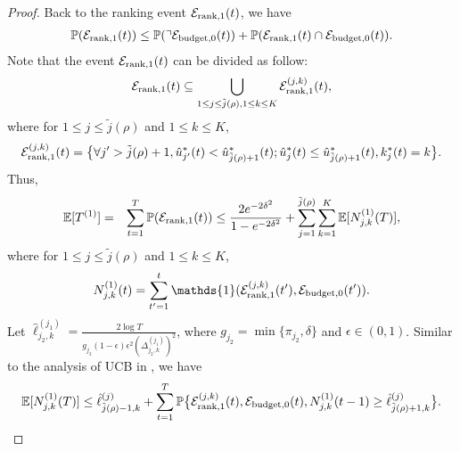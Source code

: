 \begin{proof}
Back to the ranking event $\mathcal{E}_{{\rm rank}, 1}(t)$, we have
\begin{eqnarray}
\mathbb{P}(\mathcal{E}_{{\rm rank}, 1}(t))
\leq  \mathbb{P}(\urcorner\mathcal{E}_{\rm budget, 0}(t))
+\mathbb{P}(\mathcal{E}_{{\rm rank}, 1}(t)\cap \mathcal{E}_{\rm budget, 0}(t)). \nonumber
\end{eqnarray}
Note that the event $\mathcal{E}_{{\rm rank}, 1}(t)$ can be divided as follow:
\begin{eqnarray}
\mathcal{E}_{{\rm rank}, 1}(t) \subseteq  \bigcup_{1\leq j \leq \tilde{j}(\rho), 1\leq k\leq K} \mathcal{E}^{(j,k)}_{{\rm rank}, 1}(t), \nonumber
\end{eqnarray}
where for $1 \leq j \leq \tilde{j}(\rho)$ and $1 \leq k \leq K$,
\begin{eqnarray}
 \mathcal{E}^{(j,k)}_{{\rm rank}, 1}(t) = \big\{\forall j' > \tilde{j}(\rho) +1,\hat{u}^*_{j'}(t) < \hat{u}^*_{\tilde{j}(\rho) +1}(t);
\hat{u}^*_{j}(t) \leq \hat{u}^*_{\tilde{j}(\rho)+1}(t), k_j^*(t) = k\big\}.\nonumber
\end{eqnarray}
Thus,
\begin{eqnarray}\label{eq:error1_partition}
\mathbb{E}[T^{(1)}] &=& \sum_{t = 1}^T \mathbb{P}(\mathcal{E}_{{\rm rank}, 1}(t))\leq \frac{2e^{-2\delta^2}}{1 - e^{-2\delta^2}} + \sum_{j = 1}^{\tilde{j}(\rho)} \sum_{k= 1}^K\mathbb{E}[N^{(1)}_{j,k}(T)],\nonumber\\
\end{eqnarray}
where for $1 \leq j\leq \tilde{j}(\rho)$ and $1 \leq k \leq K$,
\begin{eqnarray}
N^{(1)}_{j,k}(t) = \sum_{t' =1}^t \mathds{1}(\mathcal{E}^{(j,k)}_{{\rm rank}, 1}(t'), \mathcal{E}_{\rm budget, 0}(t')). \nonumber
\end{eqnarray}
Let  $\hat{\ell}^{(j_1)}_{j_2,k} = \frac{2\log T}{g_{j_2} (1- \epsilon)\epsilon^2(\Delta_{j_2, k}^{(j_1)})^2}$, where $g_{j_2} = \min\{\pi_{j_2}, \delta\}$ and $\epsilon \in (0,1)$.
Similar to the analysis of UCB in \cite{Auer2002ML:UCB},  we have
\begin{align}\label{eq:error1_bound_error_obervations}
\mathbb{E}[N^{(1)}_{j,k}(T)] \leq  \hat{\ell}^{(j)}_{\tilde{j}(\rho)-1,k} + \sum_{t = 1}^T \mathbb{P}\big\{\mathcal{E}^{(j,k)}_{{\rm rank}, 1}(t), \mathcal{E}_{\rm budget, 0}(t),  N^{(1)}_{j,k}(t-1) \geq  \hat{\ell}^{(j)}_{\tilde{j}(\rho)+1,k}\big\}.
\end{align}


\end{proof}

